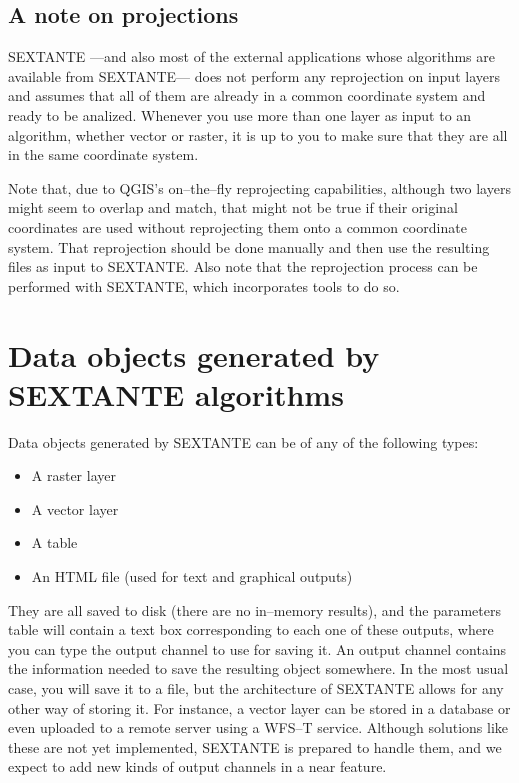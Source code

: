 \subsection{A note on projections}

SEXTANTE ---and also most of the external applications whose algorithms are available from SEXTANTE--- does not perform any reprojection on input layers and assumes that all of them are already in a common coordinate system and ready to be analized. Whenever you use more than one layer as input to an algorithm, whether vector or raster, it is up to you to make sure that they are all in the same coordinate system.

Note that, due to QGIS's on--the--fly reprojecting capabilities, although two layers might seem to overlap and match, that might not be true if their original coordinates are used without reprojecting them onto a common coordinate system. That reprojection should be done manually and then use the resulting files as input to SEXTANTE. Also note that the reprojection process can be performed with SEXTANTE, which incorporates tools to do so.

\section{Data objects generated by SEXTANTE algorithms}

Data objects generated by SEXTANTE can be of any of the following types:

\begin{itemize}
 \item A raster layer
\item A vector layer
\item A table
\item An HTML file (used for text and graphical outputs)
\end{itemize}

They are all saved to disk (there are no in--memory results), and the parameters table will contain a text box corresponding to each one of these outputs, where you can type the output channel to use for saving it. An output channel contains the information needed to save the resulting object somewhere. In the most usual case, you will save it to a file, but the architecture of SEXTANTE allows for any other way of storing it. For instance, a vector layer can be stored in a database or even uploaded to a remote server using a WFS--T service. Although solutions like these are not yet implemented, SEXTANTE is prepared to handle them, and we expect to add new kinds of output channels in a near feature.

